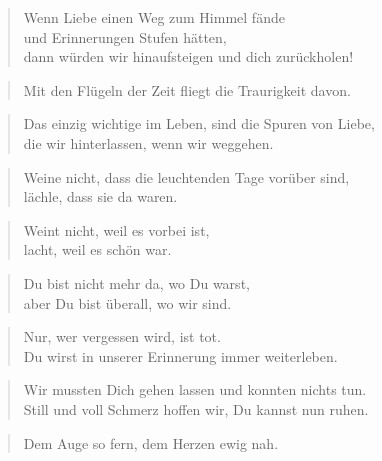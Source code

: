 \documentclass[ngerman,a4paper,11pt]{scrreprt}
\begin{document}
\begin{verse}
Wenn Liebe einen Weg zum Himmel fände \\
und Erinnerungen Stufen hätten, \\
dann würden wir hinaufsteigen und dich zurückholen! \\
\end{verse}

\begin{verse}
Mit den Flügeln der Zeit fliegt die Traurigkeit davon. \\
\end{verse}

\begin{verse}
Das einzig wichtige im Leben, sind die Spuren von Liebe, \\
die wir hinterlassen, wenn wir weggehen. \\
\end{verse}

\begin{verse}
Weine nicht, dass die leuchtenden Tage vorüber sind, \\
lächle, dass sie da waren. \\
\end{verse}

\begin{verse}
Weint nicht, weil es vorbei ist, \\
lacht, weil es schön war. \\
\end{verse}

\begin{verse}
Du bist nicht mehr da, wo Du warst, \\
aber Du bist überall, wo wir sind. \\
\end{verse}

\begin{verse}
Nur, wer vergessen wird, ist tot. \\
Du wirst in unserer Erinnerung immer weiterleben. \\
\end{verse}

\begin{verse}
Wir mussten Dich gehen lassen und konnten nichts tun. \\
Still und voll Schmerz hoffen wir, Du kannst nun ruhen. \\
\end{verse}

\begin{verse}
Dem Auge so fern, dem Herzen ewig nah. \\
\end{verse}
\end{document}
